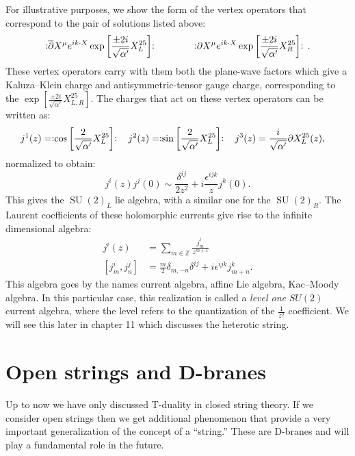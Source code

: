 \documentclass{report}
\theoremstyle{plain}
\theoremstyle{definition}
\theoremstyle{remark}
\newcommand{\FR}[2]{\frac{#1}{#2}}
\newcommand{\di}{\partial}
\newcommand{\NO}[1]{\vcentcolon\mathrel{#1}\vcentcolon\,}
\newcommand{\bZ}{\mathbb{Z}}
\DeclareMathOperator{\SU}{SU}
\begin{document}
For illustrative purposes, we show the form of the vertex operators that
correspond to the pair of solutions listed above: \[
\NO{\overline\di X^\mu e^{ik\cdot X}\exp\left[\FR{\pm2i}{\sqrt{\alpha'}}X^{25}_L\right]}
\qquad\qquad
\NO{\di X^\mu e^{ik\cdot X}\exp\left[\FR{\pm2i}{\sqrt{\alpha'}} X^{25}_R\right]}.\]
These vertex operators carry with them both the plane-wave factors which
give a Kaluza--Klein charge and antisymmetric-tensor gauge charge,
corresponding to the $\exp\left[\FR{\pm2i}{\sqrt{\alpha'}} X^{25}_{L,R}
\right]$.
The charges that act on these vertex operators can be written as:
\begin{align*}
    j^1(z) &= \NO{\cos\left[ \FR{2}{\sqrt{\alpha'}}X^{25}_L \right]}
  & j^2(z) &= \NO{\sin\left[ \FR{2}{\sqrt{\alpha'}}X^{25}_L \right]}
  & j^3(z) &= \FR{i}{\sqrt{\alpha'}}\di X^{25}_L(z),
\end{align*}
normalized to obtain:
\[j^i(z)j^j(0)\sim \FR{\delta^{ij}}{2z^2}+i\FR{\epsilon^{ijk}}{z}j^k(0).\]
This gives the $\SU(2)_L$ lie algebra, with a similar one for the
$\SU(2)_R$. The Laurent coefficients of these holomorphic currents give
rise to the infinite dimensional algebra:
\begin{align*}
    j^i(z) &= \sum_{m\in\bZ} \FR{j^i_m}{z^{m+1}}\\
[j^i_m,j^j_n]&= \FR{m}{2}\delta_{m,-n}\delta^{ij}+i\epsilon^{ijk}j^k_{m+n}.
\end{align*}
This algebra goes by the names current algebra, affine Lie algebra,
Kac--Moody algebra. In this particular case, this realization is called a
\emph{level one} $SU(2)$ current algebra, where the level refers to the
quantization of the $\FR{1}{z^2}$ coefficient. We will see this later in
chapter 11 which discusses the heterotic string.

\section{Open strings and D-branes}

Up to now we have only discussed T-duality in closed string theory. If we
consider open strings then we get additional phenomenon that provide a very
important generalization of the concept of a ``string.'' These are D-branes
and will play a fundamental role in the future.
\end{document}
